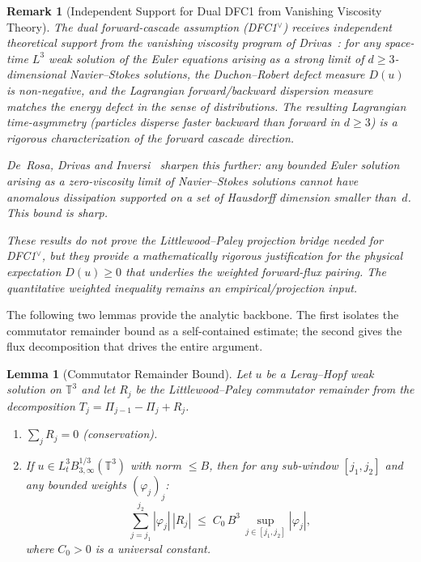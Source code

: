 \documentclass[12pt,a4paper]{article}
\theoremstyle{breakdef}
\theoremstyle{breakplain}
\newtheorem{lemma}[definition]{Lemma}
\theoremstyle{breakdef}
\newtheorem{remark}[definition]{Remark}
\begin{document}
\begin{remark}[Independent Support for Dual DFC1 from Vanishing Viscosity Theory]
\label{rem:Drivas-VV}
The dual forward-cascade assumption (DFC1$^\vee$) receives independent theoretical
support from the vanishing viscosity program of
Drivas~\cite{Drivas2019cascade}:
for any space-time $L^3$ weak solution of the Euler equations arising as a
strong limit of $d\ge 3$-dimensional Navier--Stokes solutions, the
Duchon--Robert defect measure $D(u)$ is non-negative, and the Lagrangian
forward/backward dispersion measure matches the energy defect in the sense
of distributions. The resulting Lagrangian time-asymmetry (particles
disperse faster backward than forward in $d\ge 3$) is a rigorous
characterization of the forward cascade direction.

De~Rosa, Drivas and Inversi~\cite{DeRosaDrivasInversi2024} sharpen this
further: any bounded Euler solution arising as a zero-viscosity limit of
Navier--Stokes solutions cannot have anomalous dissipation supported on a
set of Hausdorff dimension smaller than~$d$. This bound is sharp.

These results do \emph{not} prove the Littlewood--Paley projection bridge
needed for DFC1$^\vee$, but they provide a mathematically rigorous
justification for the physical expectation $D(u)\ge0$ that underlies the
weighted forward-flux pairing. The quantitative weighted inequality
remains an empirical/projection input.
\end{remark}

The following two lemmas provide the analytic backbone. The first
isolates the commutator remainder bound as a self-contained estimate;
the second gives the flux decomposition that drives the entire argument.

\begin{lemma}[Commutator Remainder Bound]\label{lem:remainder}
Let $u$ be a Leray--Hopf weak solution on $\mathbb{T}^3$ and let $R_j$
be the Littlewood--Paley commutator remainder from the decomposition
$T_j = \Pi_{j-1} - \Pi_j + R_j$.
\begin{enumerate}
  \item[\textup{(i)}] $\sum_j R_j = 0$ (conservation).
  \item[\textup{(ii)}] If $u \in L^3_t B^{1/3}_{3,\infty}(\mathbb{T}^3)$
    with norm $\le B$, then for any sub-window $[j_1, j_2]$ and any
    bounded weights $(\varphi_j)_j$:
    \begin{equation}\label{eq:Rj-bound}
      \sum_{j=j_1}^{j_2} |\varphi_j|\,|R_j|
      \;\le\;
      C_0\,B^3\,\sup_{j \in [j_1,j_2]} |\varphi_j|,
    \end{equation}
    where $C_0 > 0$ is a universal constant.
\end{enumerate}
\end{lemma}
\end{document}
